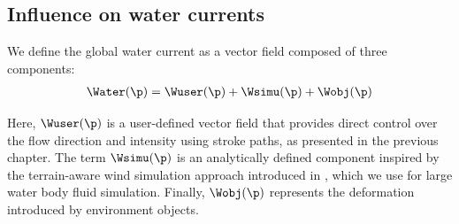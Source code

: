 



\subsection{Influence on water currents}
\label{sec:env-obj-water-currents}

We define the global water current as a vector field composed of three components:
\begin{align}
\Water(\p) = \Wuser(\p) + \Wsimu(\p) + \Wobj(\p)
\end{align}

Here, $\Wuser(\p)$ is a user-defined vector field that provides direct control over the flow direction and intensity using stroke paths, as presented in the previous chapter. The term $\Wsimu(\p)$ is an analytically defined component inspired by the terrain-aware wind simulation approach introduced in \citep{Paris2019b}, which we use for large water body fluid simulation. Finally, $\Wobj(\p)$ represents the deformation introduced by environment objects.

